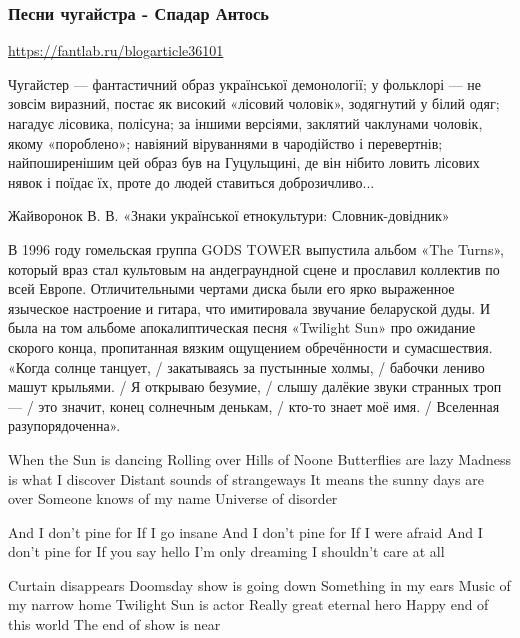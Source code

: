  
 

\subsubsection{Песни чугайстра - Спадар Антось}
\label{sec:songs.tin_soncja.pisnja_chugajstera.spadar_antos}

\url{https://fantlab.ru/blogarticle36101}

Чугайстер --- фантастичний образ української демонології; у фольклорі --- не зовсім
виразний, постає як високий «лісовий чоловік», зодягнутий у білий одяг; нагадує
лісовика, полісуна; за іншими версіями, заклятий чаклунами чоловік, якому
«пороблено»; навіяний віруваннями в чародійство і перевертнів; найпоширенішим
цей образ був на Гуцульщині, де він нібито ловить лісових нявок і поїдає їх,
проте до людей ставиться доброзичливо...

Жайворонок В. В. «Знаки української етнокультури: Словник-довідник»

В 1996 году гомельская группа GODS TOWER выпустила альбом «The Turns», который
враз стал культовым на андеграундной сцене и прославил коллектив по всей
Европе. Отличительными чертами диска были его ярко выраженное языческое
настроение и гитара, что имитировала звучание беларуской дуды. И была на том
альбоме апокалиптическая песня «Twilight Sun» про ожидание скорого конца,
пропитанная вязким ощущением обречённости и сумасшествия. «Когда солнце
танцует, / закатываясь за пустынные холмы, / бабочки лениво машут крыльями. / Я
открываю безумие, / слышу далёкие звуки странных троп --- / это значит, конец
солнечным денькам, / кто-то знает моё имя. / Вселенная разупорядоченна».

When the Sun is dancing
Rolling over Hills of Noone
Butterflies are lazy
Madness is what I discover
Distant sounds of strangeways
It means the sunny days are over
Someone knows of my name
Universe of disorder

And I don't pine for
If I go insane
And I don't pine for
If I were afraid
And I don't pine for
If you say hello
I'm only dreaming
I shouldn't care at all

Curtain disappears
Doomsday show is going down
Something in my ears
Music of my narrow home
Twilight Sun is actor
Really great eternal hero
Happy end of this world
The end of show is near

